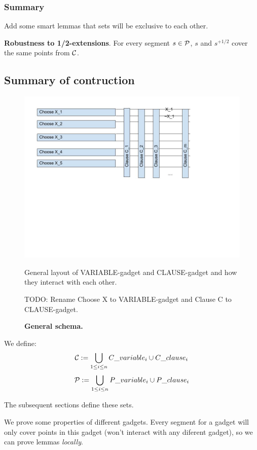 \subsubsection{Summary}

Add some smart lemmas that sets will be exclusive to each other.

\begin{lemma}
\textbf{Robustness to 1/2-extensions}. For every segment $s \in \mathcal{P}$,
$s$ and $s^{+1/2}$ cover the same points from $\mathcal{C}$.
\end{lemma}


\subsection{Summary of contruction}

\begin{figure}
\centering
\includegraphics[width=\linewidth]{segment_apx_sketch.jpg}
\caption{\textbf{General schema.}}
General layout of VARIABLE-gadget and CLAUSE-gadget and how they
interact with each other.

TODO: Rename Choose X to VARIABLE-gadget and Clause C to CLAUSE-gadget.
\label{fig:segment_apx_sketch}
\end{figure}

We define:
$$\mathcal{C} := \bigcup_{1 \le i \le n} C\_variable_i \cup C\_clause_i $$
$$\mathcal{P} := \bigcup_{1 \le i \le n} P\_variable_i \cup P\_clause_i $$

The subsequent sections define these sets.

We prove some properties of different gadgets.
Every segment for a gadget will only cover points 
in this gadget (won't interact with any diferent gadget),
so we can prove lemmas \textit{locally}.


